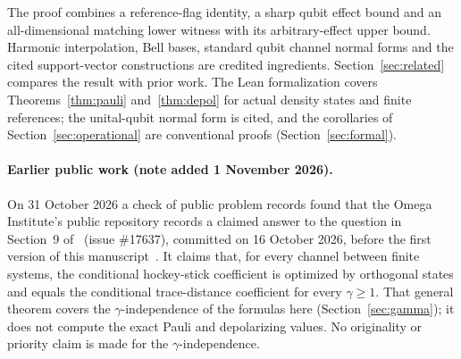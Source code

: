 \documentclass[11pt,a4paper]{article}
\begin{document}
The proof combines a reference-flag identity, a sharp qubit effect bound and an all-dimensional matching lower witness with its arbitrary-effect upper bound. Harmonic interpolation, Bell bases, standard qubit channel normal forms and the cited support-vector constructions are credited ingredients. Section~\ref{sec:related} compares the result with prior work. The Lean formalization covers Theorems~\ref{thm:pauli} and~\ref{thm:depol} for actual density states and finite references; the unital-qubit normal form is cited, and the corollaries of Section~\ref{sec:operational} are conventional proofs (Section~\ref{sec:formal}).

\paragraph{Earlier public work (note added 1 November 2026).}
On 31 October 2026 a check of public problem records found that the Omega Institute's public repository records a claimed answer to the question in Section~9 of~\cite{Conditional} (issue \#17637), committed on 16 October 2026, before the first version of this manuscript~\cite{OmegaContraction}. It claims that, for every channel between finite systems, the conditional hockey-stick coefficient is optimized by orthogonal states and equals the conditional trace-distance coefficient for every $\gamma\ge1$. That general theorem covers the $\gamma$-independence of the formulas here (Section~\ref{sec:gamma}); it does not compute the exact Pauli and depolarizing values. No originality or priority claim is made for the $\gamma$-independence.
\end{document}
